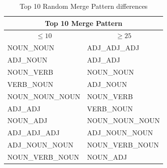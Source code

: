 \documentclass[12pt]{article}
\begin{document}
\begin{table}[!h]

\begin{tabular}{|ll|}
\hline
\multicolumn{2}{|c|}{Top 10 Merge Pattern}                      \\ \hline
\multicolumn{1}{|c|}{$\leq10$}            & \multicolumn{1}{c|}{$\geq25$} \\ \hline
\multicolumn{1}{|l|}{NOUN\_NOUN}      & ADJ\_ADJ\_ADJ              \\ \hline
\multicolumn{1}{|l|}{ADJ\_NOUN}       & ADJ\_ADJ                  \\ \hline
\multicolumn{1}{|l|}{NOUN\_VERB}      & NOUN\_NOUN                \\ \hline
\multicolumn{1}{|l|}{VERB\_NOUN}      & ADJ\_NOUN                 \\ \hline
\multicolumn{1}{|l|}{NOUN\_NOUN\_NOUN} & NOUN\_VERB                \\ \hline
\multicolumn{1}{|l|}{ADJ\_ADJ}        & VERB\_NOUN                \\ \hline
\multicolumn{1}{|l|}{NOUN\_ADJ}       & NOUN\_NOUN\_NOUN           \\ \hline
\multicolumn{1}{|l|}{ADJ\_ADJ\_ADJ}    & ADJ\_NOUN\_NOUN           \\ \hline
\multicolumn{1}{|l|}{ADJ\_NOUN\_NOUN}  & NOUN\_VERB\_NOUN           \\ \hline
\multicolumn{1}{|l|}{NOUN\_VERB\_NOUN} & NOUN\_ADJ                 \\ \hline
\end{tabular}
\caption{Top 10 Random Merge Pattern differences}
\label{appendix:top10RMergeDiff}

\end{table}
\end{document}
